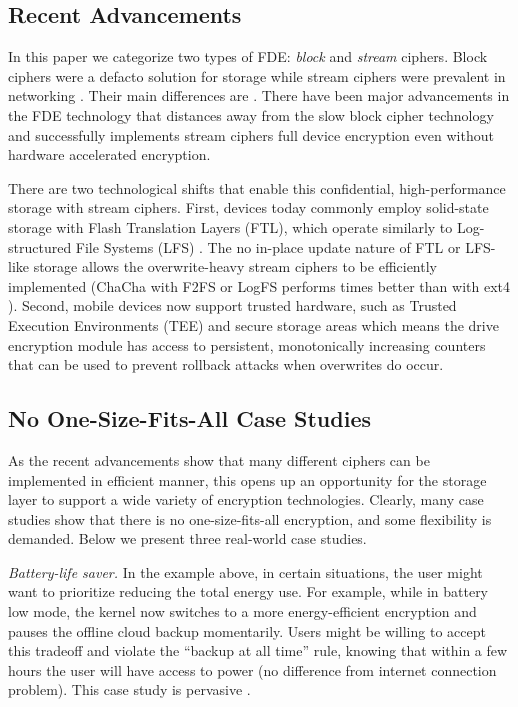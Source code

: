 \subsection{Recent Advancements}

In this paper we categorize two types of FDE: {\em block} and {\em stream}
ciphers. Block ciphers were a defacto solution for storage while stream ciphers
were prevalent in networking . Their main differences are . There have been major advancements in the FDE
technology that distances away from the slow block cipher technology and
successfully implements stream ciphers full device encryption \cite{Adiantum,
StrongBox} even without hardware accelerated encryption.


There are two technological shifts that enable this confidential,
high-performance storage with stream ciphers. First, devices today commonly
employ solid-state storage with Flash Translation Layers (FTL), which operate
similarly to Log-structured File Systems (LFS) \cite{21, 22, 27-fromStrongBox}.
The no in-place update nature of FTL or LFS-like storage allows the
overwrite-heavy stream ciphers to be efficiently implemented (\eg ChaCha with
F2FS or LogFS performs \xxx times better than with ext4 \cite{StrongBox}).
Second, mobile devices now support trusted hardware, such as Trusted Execution
Environments (TEE) \cite{24, 29-fromStrongBox} and secure storage areas
\cite{10-fromStrongBox} which means the drive encryption module has access to
persistent, monotonically increasing counters that can be used to prevent
rollback attacks when overwrites do occur.


\subsection{No One-Size-Fits-All Case Studies}

As the recent advancements show that many different ciphers can be implemented
in efficient manner, this opens up an opportunity for the storage layer to
support a wide variety of encryption technologies. Clearly, many case studies
show that there is no one-size-fits-all encryption, and some flexibility is
demanded. Below we present three real-world case studies.

{\em Battery-life saver.} In the example above, in certain situations, the user
might want to prioritize reducing the total energy use. For example, while in
battery low mode, the kernel now switches to a more energy-efficient encryption
and pauses the offline cloud backup momentarily. Users might be willing to
accept this tradeoff and violate the ``backup at all time'' rule, knowing that
within a few hours the user will have access to power (no difference from
internet connection problem). This case study is pervasive \cite{hackernews-???,
many-more??}.

